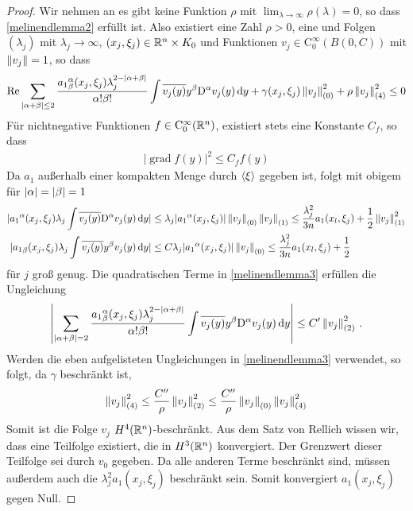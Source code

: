 \begin{proof}
Wir nehmen an es gibt keine Funktion $\rho$ mit $\lim_{\lambda\to\infty}\rho(\lambda)=0$, so dass \eqref{melinendlemma2} erfüllt ist. Also existiert eine Zahl $\rho>0$, eine und Folgen $(\lambda_j)$ mit $\lambda_j\to\infty$, $(x_j,\xi_j)\in\mathbb R^n\times K_0$ und Funktionen $v_j\in\mathrm C^\infty_0(B(0,C))$ mit $\left\lVert v_j\right\rVert =1$, so dass
\begin{align}\label{melinendlemma3}
\operatorname{Re} \sum_{|\alpha+\beta|\le 2} \frac{{a_1}^\alpha_\beta(x_j,\xi_j)\lambda_j^{2-|\alpha+\beta|}}{\alpha!\beta!}\int\overline{v_j(y)}y^\beta\mathrm D^\alpha v_j(y)\,\mathrm d y + \gamma(x_j,\xi_j)\left\lVert v_j\right\rVert_{(0)}^2 + \rho\left\lVert v_j\right\rVert _{(4)}^2 \le 0
\end{align}
Für nichtnegative Funktionen $f\in\mathrm C^\infty_0 (\mathbb R^n)$,  existiert stets eine Konstante $C_f$, so dass
\begin{align}
|\operatorname{grad}f(y)|^2\le C_f f(y)
\end{align}
Da $a_1$ außerhalb einer kompakten Menge durch $\braket{\xi}$ gegeben ist, folgt mit obigem für $\lvert\alpha\rvert=\lvert\beta\rvert=1$
\begin{align}
|{a_1}^\alpha(x_j,\xi_j)\lambda_j\int \overline{v_j(y)}\mathrm D^\alpha v_j(y)\,\mathrm d y| &\le \lambda_j|{a_1}^\alpha(x_j,\xi_j)|\left\lVert v_j\right\rVert_{(0)}\left\lVert v_j\right\rVert_{(1)} \le \frac{\lambda_j^2}{3n}a_1(x_l,\xi_j) + \frac 1 2\left\lVert v_j\right\rVert_{(1)}^2\\
|{a_1}_\beta(x_j,\xi_j)\lambda_j\int \overline{v_j(y)}y^\beta v_j(y)\,\mathrm d y| &\le C \lambda_j|{a_1}^\alpha(x_j,\xi_j)|\left\lVert v_j\right\rVert_{(0)} \le \frac{\lambda_j^2}{3n}a_1(x_l,\xi_j) + \frac 1 2
\end{align}
für $j$ groß genug. Die quadratischen Terme in \eqref{melinendlemma3} erfüllen die Ungleichung
\begin{align}
\left\lvert\sum_{|\alpha+\beta|= 2} \frac{{a_1}^\alpha_\beta(x_j,\xi_j)\lambda_j^{2-|\alpha+\beta|}}{\alpha!\beta!}\int\overline{v_j(y)}y^\beta\mathrm D^\alpha v_j(y)\,\mathrm d y\right\rvert\le C'\left\lVert v_j\right\rVert_{(2)}^2\,.
\end{align}
Werden die eben aufgelisteten Ungleichungen in \eqref{melinendlemma3} verwendet, so folgt, da $\gamma$ beschränkt ist,
\begin{align}
\left\lVert v_j\right\rVert_{(4)}^2\le \frac{C''}{\rho}\left\lVert v_j\right\rVert_{(2)}^2\le \frac{C''}{\rho}\left\lVert v_j\right\rVert_{(0)}\left\lVert v_j\right\rVert_{(4)}^2
\end{align}
Somit ist die Folge $v_j$ $H^4(\mathbb R^n)$-beschränkt. Aus dem Satz von Rellich wissen wir, dass eine Teilfolge existiert, die in $H^3(\mathbb R^n)$ konvergiert. Der Grenzwert dieser Teilfolge sei durch $v_0$ gegeben. Da alle anderen Terme beschränkt sind, müssen außerdem auch die $\lambda_j^2a_1(x_j,\xi_j)$ beschränkt sein. Somit konvergiert $a_1(x_j,\xi_j)$ gegen Null. 

\end{proof}
